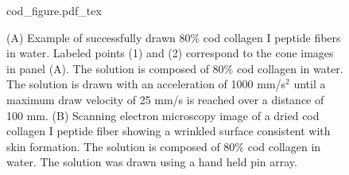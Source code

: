 \documentclass[lineno]{JFM-FLM_Au}
\begin{document}
\begin{figure}[htb]
	\centering



    \centering
    \def\svgwidth{0.8\textwidth} %
    {cod_figure.pdf_tex}
	\caption{
		(A) Example of successfully drawn 80\% cod collagen I peptide fibers in water. 
		Labeled points (1) and (2) correspond to the cone images in panel (A).
		The solution is composed of 80\% cod collagen in water. 
		The solution is drawn with an acceleration of 1000 mm/s$^2$ until a maximum draw velocity of 25 mm/s is reached over a distance of 100 mm.
		(B) Scanning electron microscopy image of a dried cod collagen I peptide fiber showing a wrinkled surface consistent with skin formation.
		The solution is composed of 80\% cod collagen in water.
		The solution was drawn using a hand held pin array. 
	}
	\label{fig:collagen_peptide}
\end{figure}
\end{document}
